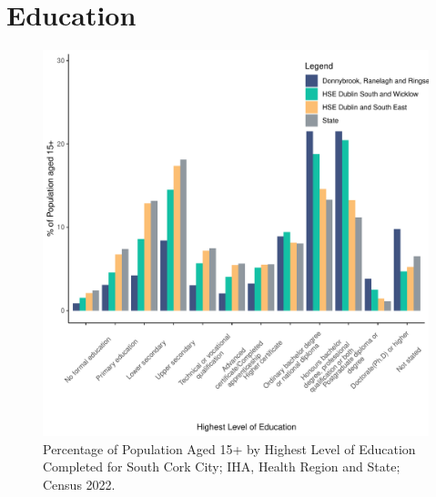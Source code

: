 \documentclass{article}
\begin{document}
\section{Education}\label{sect:Edu}
\begin{figure}[H]
	\centering
	\includegraphics[width = 120mm]{../figures/EduED.pdf}
	\caption{Percentage of Population Aged 15+ by Highest Level of Education Completed for South Cork City; IHA, Health Region and State; Census 2022.}
	\label{fig:vbnv}
	\end{figure}
\end{document}
